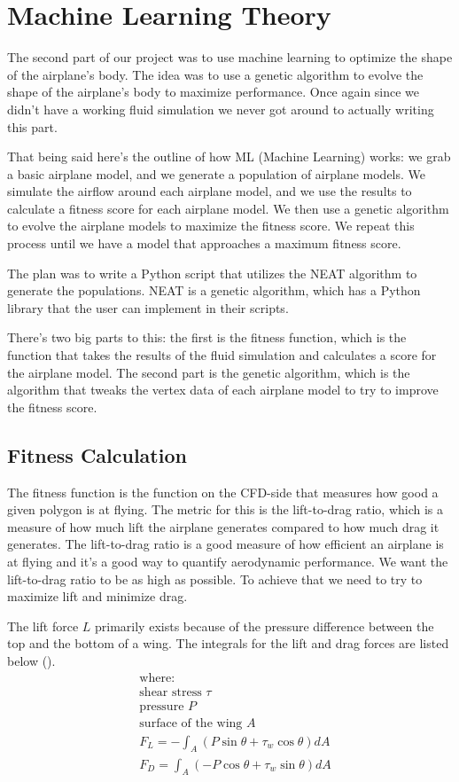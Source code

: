 \documentclass[a4paper,12pt,titlepage]{article}
\begin{document}
\section{Machine Learning Theory}
The second part of our project was to use machine learning to optimize the shape
of the airplane's body. The idea was to use a genetic algorithm to evolve the
shape of the airplane's body to maximize performance. Once again since we didn't
have a working fluid simulation we never got around to actually writing this part.

That being said here's the outline of how ML (Machine Learning) works: we grab
a basic airplane model, and we generate a population of airplane models. We
simulate the airflow around each airplane model, and we use the results to calculate
a fitness score for each airplane model. We then use a genetic algorithm to evolve
the airplane models to maximize the fitness score. We repeat this process until
we have a model that approaches a maximum fitness score.

The plan was to write a Python script that utilizes the NEAT algorithm to generate
the populations. NEAT is a genetic algorithm, which has a Python library that
the user can implement in their scripts.

There's two big parts to this: the first is the fitness function, which is the
function that takes the results of the fluid simulation and calculates a score
for the airplane model. The second part is the genetic algorithm, which is the
algorithm that tweaks the vertex data of each airplane model to try to improve
the fitness score.

\subsection{Fitness Calculation}
The fitness function is the function on the CFD-side that measures how good a
given polygon is at flying. The metric for this is the lift-to-drag ratio, which
is a measure of how much lift the airplane generates compared to how much drag
it generates. The lift-to-drag ratio is a good measure of how efficient an airplane
is at flying and it's a good way to quantify aerodynamic performance. We want the
lift-to-drag ratio to be as high as possible. To achieve that we need to try
to maximize lift and minimize drag.

The lift force $L$ primarily exists because of the pressure difference between
the top and the bottom of a wing. The integrals for the lift and drag forces are
listed below (\cite{liftdrag}).
\[
	\begin{aligned}
		& \text{where:} \\
		& \text{shear stress } \tau \\
		& \text{pressure } P \\
		& \text{surface of the wing } A \\
		& F_L = -\int_A (P \sin \theta + \tau_w \cos \theta) dA \\
		& F_D = \int_A (-P \cos \theta + \tau_w \sin \theta) dA
	\end{aligned}
\]
\end{document}
